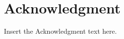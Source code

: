 \documentclass{cta-author}%
\begin{document}
\begin{comment}

\vskip2pc

\noindent The output for table is:

\begin{table}[!h]
\caption{An Example of a Table}%
\label{table_example}
\centering
\begin{tabular}{|c||c|}%
\hline
One & Two\\ %
\hline
Three & Four\\%
\hline
\end{tabular}
\end{table}%

\section{Conclusion}
The conclusion text goes here.
\end{comment}


\section*{Acknowledgment}

Insert the Acknowledgment text here.




%

\begin{comment}
	
\begin{thebibliography}{9}
\bibitem{1}
Vicsek T., Czir\'{o}k A., Ben-Jacob E., Cohen I.: `Novel type of phase transition in a system of self-driven particles', \textit{Phys. Rev. Lett.}, 1995, \textbf{75}, pp.~1226--1229

\bibitem{2}
Jadbabaie A., Lin J., Morse A.S.: `Coordination of groups of
mobile autonomous agents using nearest neighbor rules', \textit{IEEE
Trans. Autom. Control}, 2003, \textbf{48}, pp.~988--1001

\bibitem{3}
Olfati-Saber R., Murray R.M.: `Consensus problems in networks
of agents with switching topology and time-delays', \textit{IEEE Trans.
Autom. Control}, 2004, \textbf{49}, pp.~1520--1533
\end{thebibliography}
\end{comment}
\end{document}
